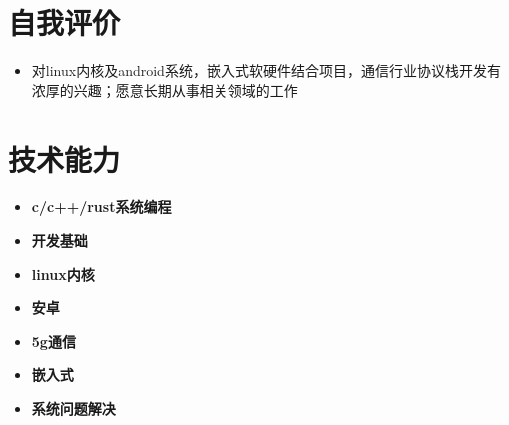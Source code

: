 \documentclass{resume}
\begin{document}



\section{自我评价}
\begin{itemize}
  
  \item 对linux内核及android系统，嵌入式软硬件结合项目，通信行业协议栈开发有浓厚的兴趣；愿意长期从事相关领域的工作
\end{itemize}

\section{技术能力}
\begin{itemize}[parsep=0.2ex]
  \item \textbf{c/c++/rust系统编程}
    \begin{itemize}
      
    \end{itemize}
  \item \textbf{开发基础}
    \begin{itemize}
      
    \end{itemize}
  \item \textbf{linux内核}
    \begin{itemize}
      
    \end{itemize}
  \item \textbf{安卓}
    \begin{itemize}
      
    \end{itemize}
  \item \textbf{5g通信}
    \begin{itemize}
      
    \end{itemize}
  \item \textbf{嵌入式}
    \begin{itemize}
      
    \end{itemize}
  \item \textbf{系统问题解决}
    \begin{itemize}
      
    \end{itemize}
\end{itemize}
\end{document}
